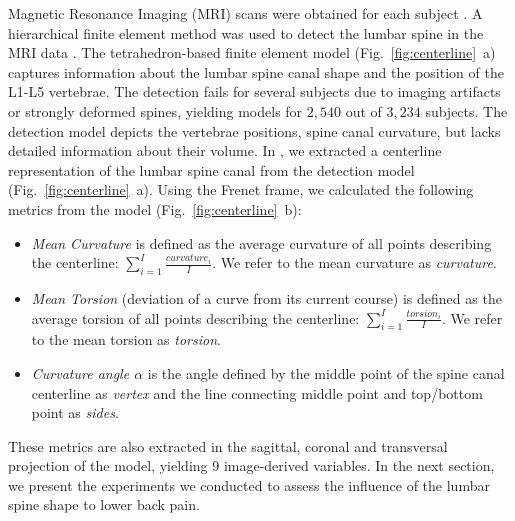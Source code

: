 \documentclass[a4paper,twoside]{style/article}
\begin{document}
Magnetic Resonance Imaging (MRI) scans were obtained for each subject \cite{Hegenscheid2013}.
A hierarchical finite element method was used to detect the lumbar spine in the MRI data \cite{Rak2013}.
The tetrahedron-based finite element model (Fig.~\ref{fig:centerline}~a) captures information about the lumbar spine canal shape and the position of the L1-L5 vertebrae.
The detection fails for several subjects due to imaging artifacts or strongly deformed spines, yielding models for $2,540$ out of $3,234$ subjects.
The detection model depicts the vertebrae positions, spine canal curvature, but lacks detailed information about their volume.
In \cite{Klemm2013VMV}, we extracted a centerline representation of the lumbar spine canal from the detection model (Fig.~\ref{fig:centerline}~a).
Using the Frenet frame, we calculated the following metrics from the model (Fig.~\ref{fig:centerline}~b): %
\begin{itemize}
	\item \emph{Mean Curvature} is defined as the average curvature of all points describing the centerline: $\sum_{i=1}^I \frac{\textit{curvature}_i}{I}$. We refer to the mean curvature as \emph{curvature}.
	\item \emph{Mean Torsion} (deviation of a curve from its current course) is defined as the average torsion of all points describing the centerline: $\sum_{i=1}^I \frac{\textit{torsion}_i}{I}$. We refer to the mean torsion as \emph{torsion}.
	\item \emph{Curvature angle $\alpha$} is the angle defined by the middle point of the spine canal centerline as \emph{vertex} and the line connecting middle point and top/bottom point as \emph{sides}.
\end{itemize}
These metrics are also extracted in the sagittal, coronal and transversal projection of the model, yielding 9 image-derived variables.
In the next section, we present the experiments we conducted to assess the influence of the lumbar spine shape to lower back pain.
\end{document}
